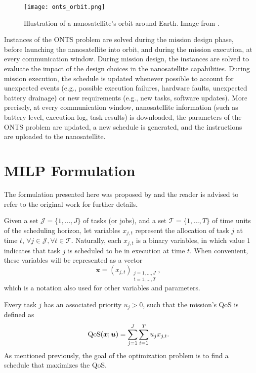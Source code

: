 \begin{figure}[h]
    \centering
    \texttt{[image: onts\_orbit.png]}
    \caption{Illustration of a nanosatellite's orbit around Earth. Image from .}
    \label{fig:onts-orbit}
\end{figure}

Instances of the ONTS problem are solved during the mission design phase, before launching the nanosatellite into orbit, and during the mission execution, at every communication window. 
During mission design, the instances are solved to evaluate the impact of the design choices in the nanosatellite capabilities.
During mission execution, the schedule is updated whenever possible to account for unexpected events (e.g., possible execution failures, hardware faults, unexpected battery drainage) or new requirements (e.g., new tasks, software updates).
More precisely, at every communication window, nanosatellite information (such as battery level, execution log, task results) is downloaded, the parameters of the ONTS problem are updated, a new schedule is generated, and the instructions are uploaded to the nanosatellite.


\section{MILP Formulation}\label{sec:onts-milp-formulation}

The formulation presented here was proposed by  and the reader is advised to refer to the original work for further details.

Given a set $\mathcal{J}=\{1,...,J\}$ of tasks (or jobs), and a set $\mathcal{T}=\{1,...,T\}$ of time units of the scheduling horizon, let variables $x_{j,t}$ represent the allocation of task $j$ at time $t$, $\forall j\in \mathcal{J}, \forall t\in \mathcal{T}$.
Naturally, each $x_{j,t}$ is a binary variables, in which value $1$ indicates that task $j$ is scheduled to be in execution at time $t$.
When convenient, these variables will be represented as a vector \[
    \bm{x} = \left( x_{j,t} \right)_{\substack{j=1,\ldots,J\\ t=1,\ldots,T}}
,\] which is a notation also used for other variables and parameters.

Every task $j$ has an associated priority $u_j > 0$, such that the mission's QoS is defined as
\begin{equation}\label{eq:qos}
    {\rm QoS}(\bm{x};\bm{u}) = \sum_{j=1}^{J} \sum_{t=1}^{T} {u}_{j} x_{j,t}
.\end{equation}
As mentioned previously, the goal of the optimization problem is to find a schedule that maximizes the QoS.

